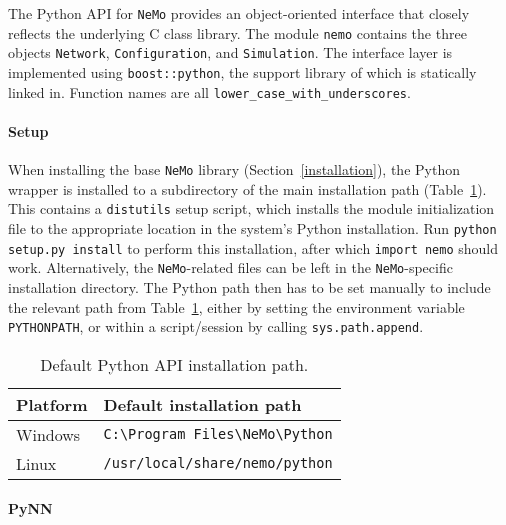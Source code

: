 \documentclass[a4paper]{article}
\newcommand{\nemo}{\texttt{NeMo}\xspace}
\newcommand{\code}[1]{\texttt{#1}}
\newcommand{\command}[1]{\texttt{#1}}
\newcommand{\file}[1]{\texttt{#1}}
\newcommand{\library}[1]{\texttt{#1}}
\newcommand{\cpp}{C\nolinebreak\hspace{-.05em}\raisebox{.4ex}{\tiny\bf +}\nolinebreak\hspace{-.10em}\raisebox{.4ex}{\tiny\bf +}\xspace}
\begin{document}

The Python API for \nemo provides an object-oriented interface that closely
reflects the underlying \cpp class library. The module \library{nemo} contains
the three objects \code{Network}, \code{Configuration}, and \code{Simulation}.
The interface layer is implemented using \library{boost::python}, the support
library of which is statically linked in. Function names are all
\code{lower\_case\_with\_underscores}.

\paragraph{Setup}

When installing the base \nemo library (Section~\ref{installation}), the
Python wrapper is installed to a subdirectory of the main installation path
(Table~\ref{tab:python-path}). This contains a \command{distutils} setup
script, which installs the module initialization file to the appropriate
location in the system's Python installation. Run \code{python setup.py
install} to perform this installation, after which \code{import nemo} should
work. Alternatively, the \nemo-related files can be left in the \nemo-specific
installation directory. The Python path then has to be set manually to include
the relevant path from Table~\ref{tab:python-path}, either by setting the
environment variable \command{PYTHONPATH}, or within a script/session by
calling \code{sys.path.append}.

\begin{table}[!hb]
	\centering
	\begin{tabular}{ll}
		Platform & Default installation path \\
		\hline
		Windows & \file{C:\textbackslash Program Files\textbackslash NeMo\textbackslash Python} \\
		Linux & \file{/usr/local/share/nemo/python} \\
		\hline
	\end{tabular}
	\caption{Default Python API installation path.}
	\label{tab:python-path}
\end{table}

\paragraph{PyNN}
\end{document}
